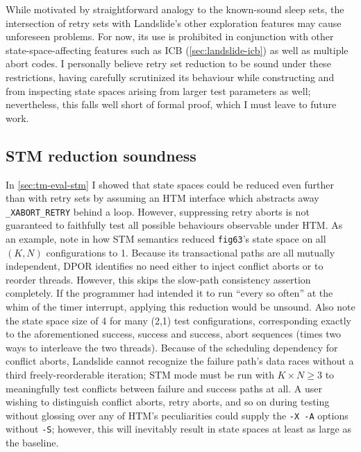 While
motivated by straightforward analogy to the known-sound sleep sets,
the intersection of retry sets with Landslide's other exploration features may cause unforeseen problems.
For now, its use is prohibited in conjunction with other state-space-affecting features
such as ICB (\cref{sec:landslide-icb})
as well as multiple abort codes.
I personally believe retry set reduction to be sound under these restrictions,
having carefully scrutinized its behaviour
while constructing 
and from inspecting state spaces arising from larger test parameters as well; %
nevertheless, this falls well short of formal proof, which I must leave to future work.

\subsection{STM reduction soundness}

In \cref{sec:tm-eval-stm} I showed that state spaces could be reduced even further than with retry sets
by assuming an HTM interface which abstracts away {\tt \_XABORT\_RETRY} behind a loop.
However, suppressing retry aborts is not guaranteed to faithfully test all possible behaviours
observable under HTM.
As an example, note in 
how STM semantics reduced %
{\tt fig63}'s state space on all $(K,N)$ configurations to 1.
Because its transactional paths are all mutually independent,
DPOR identifies no need either to inject conflict aborts or to reorder threads.
However, this skips the slow-path consistency assertion completely.
If the programmer had intended it to run ``every so often'' at the whim of the timer interrupt,
applying this reduction would be unsound.
Also note the state space size of 4 for many (2,1) test configurations,
corresponding exactly to the aforementioned success, success and success, abort sequences
(times two ways to interleave the two threads).
Because of the scheduling dependency for conflict aborts,
Landslide cannot recognize the failure path's data races
without a third freely-reorderable iteration;
STM mode must be run with $K \times N \ge 3$ to meaningfully test conflicts between failure and success paths at all.
A user wishing to distinguish conflict aborts, retry aborts, and so on during testing
without glossing over any of HTM's peculiarities
could supply the {\tt -X -A} options without {\tt -S};
however, this will inevitably result in state spaces at least as large as the baseline.

